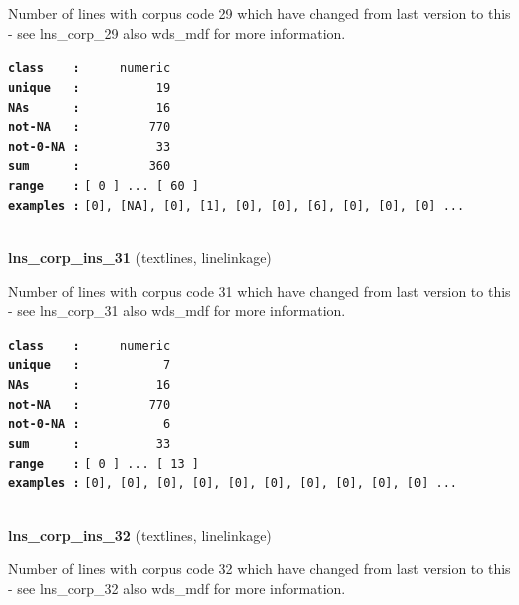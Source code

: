 \documentclass[]{article}
\begin{document}
Number of lines with corpus code 29 which have changed from last version
to this - see lns\_corp\_29 also wds\_mdf for more information.

\textbf{\texttt{class\ \ \ \ :}} \texttt{~~~~~numeric}\\
\textbf{\texttt{unique\ \ \ :}} \texttt{~~~~~~~~~~19}\\
\textbf{\texttt{NAs\ \ \ \ \ \ :}} \texttt{~~~~~~~~~~16}\\
\textbf{\texttt{not-NA\ \ \ :}} \texttt{~~~~~~~~~770}\\
\textbf{\texttt{not-0-NA\ :}} \texttt{~~~~~~~~~~33}\\
\textbf{\texttt{sum\ \ \ \ \ \ :}} \texttt{~~~~~~~~~360}\\
\textbf{\texttt{range\ \ \ \ :}}
\texttt{{[}\ 0\ {]}\ ...\ {[}\ 60\ {]}}\\
\textbf{\texttt{examples\ :}}
\texttt{{[}0{]},\ {[}NA{]},\ {[}0{]},\ {[}1{]},\ {[}0{]},\ {[}0{]},\ {[}6{]},\ {[}0{]},\ {[}0{]},\ {[}0{]}\ ...}\\

~

\textbf{lns\_corp\_ins\_31} (textlines, linelinkage)

Number of lines with corpus code 31 which have changed from last version
to this - see lns\_corp\_31 also wds\_mdf for more information.

\textbf{\texttt{class\ \ \ \ :}} \texttt{~~~~~numeric}\\
\textbf{\texttt{unique\ \ \ :}} \texttt{~~~~~~~~~~~7}\\
\textbf{\texttt{NAs\ \ \ \ \ \ :}} \texttt{~~~~~~~~~~16}\\
\textbf{\texttt{not-NA\ \ \ :}} \texttt{~~~~~~~~~770}\\
\textbf{\texttt{not-0-NA\ :}} \texttt{~~~~~~~~~~~6}\\
\textbf{\texttt{sum\ \ \ \ \ \ :}} \texttt{~~~~~~~~~~33}\\
\textbf{\texttt{range\ \ \ \ :}}
\texttt{{[}\ 0\ {]}\ ...\ {[}\ 13\ {]}}\\
\textbf{\texttt{examples\ :}}
\texttt{{[}0{]},\ {[}0{]},\ {[}0{]},\ {[}0{]},\ {[}0{]},\ {[}0{]},\ {[}0{]},\ {[}0{]},\ {[}0{]},\ {[}0{]}\ ...}\\

~

\textbf{lns\_corp\_ins\_32} (textlines, linelinkage)

Number of lines with corpus code 32 which have changed from last version
to this - see lns\_corp\_32 also wds\_mdf for more information.
\end{document}
